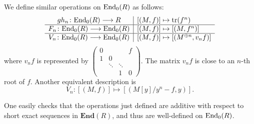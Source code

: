 We define similar operations on $\mathrm{End}_0(R)$ as follows:
\begin{equation*}
	\begin{array}{c|l}
	 gh_n\colon \mathrm{End}_0(R) \longrightarrow R & [(M,f)] \mapsto \mathrm{tr}(f^n)  \\
	\hline
	 F_n \colon \mathrm{End}_0(R) \longrightarrow \mathrm{End}_0(R) &  [(M,f)]\mapsto [(M,f^n)]  \\
	\hline
	V_n \colon \mathrm{End}_0(R) \longrightarrow \mathrm{End}_0(R)  &[(M,f)]\mapsto [(M^{\oplus n},v_nf)]
\end{array}
\end{equation*}
where $v_nf$ is represented by $\begin{pmatrix}
	0& &  &f\\1&0 & &\\ &\ddots&\ddots&\\ & &1&0
\end{pmatrix}$. The matrix $v_nf$ is close to an $n$-th root of $f$. Another equivalent description is
\[V_n\colon [(M,f)] \mapsto [(M[y]/y^n-f,y)].\]

One easily checks that the operations just defined are additive with respect to short exact sequences in $\mathbf{End}(R)$, and thus are well-defined on $\mathrm{End}_0(R)$.

